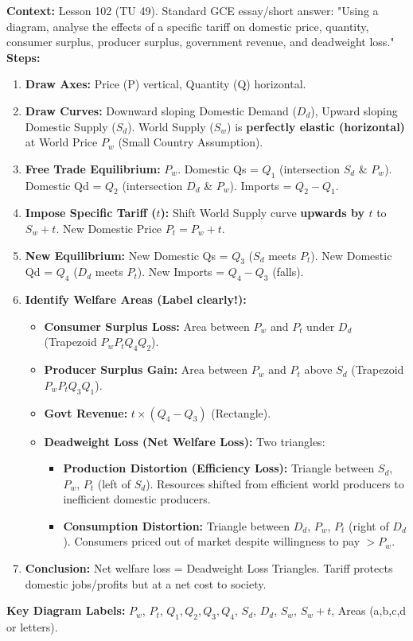 \documentclass[11pt]{article}
\begin{document}
\begin{methode}
\textbf{Context:} Lesson 102 (TU 49). Standard GCE essay/short answer: "Using a diagram, analyse the effects of a specific tariff on domestic price, quantity, consumer surplus, producer surplus, government revenue, and deadweight loss."
\textbf{Steps:}
\begin{enumerate}
    \item \textbf{Draw Axes:} Price (P) vertical, Quantity (Q) horizontal.
    \item \textbf{Draw Curves:} Downward sloping Domestic Demand ($D_d$), Upward sloping Domestic Supply ($S_d$). World Supply ($S_w$) is \textbf{perfectly elastic (horizontal)} at World Price $P_w$ (Small Country Assumption).
    \item \textbf{Free Trade Equilibrium:} $P_w$. Domestic Qs = $Q_1$ (intersection $S_d$ \& $P_w$). Domestic Qd = $Q_2$ (intersection $D_d$ \& $P_w$). Imports = $Q_2 - Q_1$.
    \item \textbf{Impose Specific Tariff ($t$):} Shift World Supply curve \textbf{upwards by $t$} to $S_w + t$. New Domestic Price $P_t = P_w + t$.
    \item \textbf{New Equilibrium:} New Domestic Qs = $Q_3$ ($S_d$ meets $P_t$). New Domestic Qd = $Q_4$ ($D_d$ meets $P_t$). New Imports = $Q_4 - Q_3$ (falls).
    \item \textbf{Identify Welfare Areas (Label clearly!):}
        \begin{itemize}
            \item \textbf{Consumer Surplus Loss:} Area between $P_w$ and $P_t$ under $D_d$ (Trapezoid $P_w P_t Q_4 Q_2$).
            \item \textbf{Producer Surplus Gain:} Area between $P_w$ and $P_t$ above $S_d$ (Trapezoid $P_w P_t Q_3 Q_1$).
            \item \textbf{Govt Revenue:} $t \times (Q_4 - Q_3)$ (Rectangle).
            \item \textbf{Deadweight Loss (Net Welfare Loss):} Two triangles:
                \begin{itemize}
                    \item \textbf{Production Distortion (Efficiency Loss):} Triangle between $S_d$, $P_w$, $P_t$ (left of $S_d$). Resources shifted from efficient world producers to inefficient domestic producers.
                    \item \textbf{Consumption Distortion:} Triangle between $D_d$, $P_w$, $P_t$ (right of $D_d$). Consumers priced out of market despite willingness to pay $> P_w$.
                \end{itemize}
        \end{itemize}
    \item \textbf{Conclusion:} Net welfare loss = Deadweight Loss Triangles. Tariff protects domestic jobs/profits but at a net cost to society.
\end{enumerate}
\textbf{Key Diagram Labels:} $P_w$, $P_t$, $Q_1, Q_2, Q_3, Q_4$, $S_d$, $D_d$, $S_w$, $S_w+t$, Areas (a,b,c,d or letters).
\end{methode}
\end{document}
